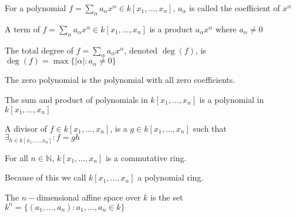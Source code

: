 \documentclass[crop=false,class=book,oneside]{standalone}
\begin{document}
                \begin{definition}
                    For a polynomial
                    $f=\sum_{\alpha}%
                       a_{\alpha}x^{\alpha}%
                       \in{k}[x_1,\hdots ,x_n]$,
                    $a_\alpha$ is called the
                    coefficient of $x^{\alpha}$
                \end{definition}
                \begin{definition}
                    A term of
                    $f=\sum_{\alpha}a_{\alpha}x^{\alpha}%
                       \in k[x_1,\hdots ,x_n]$ is a product
                    $a_{\alpha}x^{\alpha}$ where
                    $a_{\alpha}\ne{0}$
                \end{definition}
                \begin{definition}
                    The total degree of
                    $f=\sum_{\alpha}a_\alpha x^\alpha$,
                    denoted $\deg(f)$, is
                    $\deg(f)=\max\{|\alpha|:a_\alpha\ne{0}\}$
                \end{definition}
                \begin{definition}
                    The zero polynomial is the
                    polynomial with all zero coefficients.
                \end{definition}
                \begin{theorem}
                    The sum and product of polynomials in
                    $k[x_1,\hdots ,x_n]$ is a polynomial
                    in $k[x_1,\hdots,x_n]$
                \end{theorem}
                \begin{definition}
                    A divisor of $f\in k[x_{1},\hdots,x_{n}]$,
                    is a $g\in k[x_{1},\hdots,x_{n}]$ such that
                    $\exists_{h\in k[x_{1},\hdots,x_{n}]}:f=gh$
                \end{definition}
                \begin{theorem}
                    For all $n\in\mathbb{N}$,
                    $k[x_1,\hdots ,x_n]$ is a commutative ring.
                \end{theorem}
                \begin{remark}
                    Because of this we call
                    $k[x_1,\hdots ,x_n]$ a polynomial ring.
                \end{remark}
                \begin{definition}
                    The $n-$dimensional affine space over
                    $k$ is the set
                    $k^{n}%
                     =\{(a_1,\hdots,a_n):a_1,\hdots,a_n \in k\}$
                \end{definition}
\end{document}
